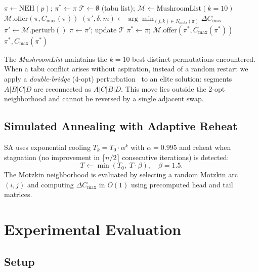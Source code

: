 \documentclass[runningheads]{llncs}
\begin{document}
\begin{algorithm}[h]
\caption{ILS with MushroomList diversification}
\begin{algorithmic}[1]
\State $\pi \gets \text{NEH}(p)$; $\pi^* \gets \pi$
\State $\mathcal{T} \gets \emptyset$ (tabu list); $\mathcal{M} \gets \text{MushroomList}(k=10)$
\State $\mathcal{M}.\text{offer}(\pi, C_{\max}(\pi))$
  \State $(\pi', \delta, m) \gets \arg\min_{(j,k) \in N_{\mathrm{motz}}(\pi)} \Delta C_{\max}$
    \State $\pi' \gets \mathcal{M}.\text{perturb}()$ 
  \EndIf
  \State $\pi \gets \pi'$; update $\mathcal{T}$
    \State $\pi^* \gets \pi$; $\mathcal{M}.\text{offer}(\pi^*, C_{\max}(\pi^*))$
  \EndIf
\EndWhile
\Return $\pi^*, C_{\max}(\pi^*)$
\end{algorithmic}
\end{algorithm}

The \emph{MushroomList} maintains the $k=10$ best distinct permutations encountered. When a tabu conflict arises without aspiration, instead of a random restart we apply a \emph{double-bridge} (4-opt) perturbation~\cite{lkh} to an elite solution: segments $A|B|C|D$ are reconnected as $A|C|B|D$. This move lies outside the 2-opt neighborhood and cannot be reversed by a single adjacent swap.

\subsection{Simulated Annealing with Adaptive Reheat}

SA uses exponential cooling $T_k = T_0 \cdot \alpha^k$ with $\alpha = 0.995$ and reheat when stagnation (no improvement in $\lceil n/2 \rceil$ consecutive iterations) is detected:
\[
T \gets \min(T_0,\; T \cdot \beta),\quad \beta = 1.5.
\]
The Motzkin neighborhood is evaluated by selecting a random Motzkin arc $(i,j)$ and computing $\Delta C_{\max}$ in $O(1)$ using precomputed head and tail matrices.

\section{Experimental Evaluation}

\subsection{Setup}
\end{document}
